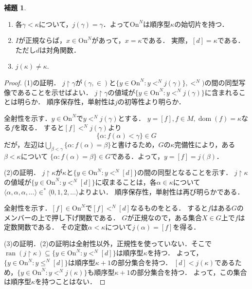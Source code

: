 \documentclass[uplatex]{jsarticle}
\newcommand{\range}{\operatorname{ran}}
\newcommand{\dom}{\operatorname{dom}}
\newcommand{\Ordinals}{\mathrm{On}}
\newcommand{\restrict}{\upharpoonright}
\newcommand{\seq}[1]{{\langle#1\rangle}}
\renewcommand\subset{\subseteq}
\theoremstyle{definition}
\newtheorem{lem}[thm]{補題}
\begin{document}
	\begin{lem}
		\begin{enumerate}
			\item 各$\gamma < \kappa$について，$j(\gamma) = \gamma$．よって$\Ordinals^N$は順序型$\kappa$の始切片を持つ．
			\item $I$が正規ならば，$x \in \Ordinals^N$があって，$x = \kappa$である．
			実際，$[d] = \kappa$である．ただし$d$は対角関数．
			\item $j(\kappa) \ne \kappa$.
		\end{enumerate}
	\end{lem}
	\begin{proof}
		(1)の証明．
		$j \upharpoonright \gamma$が$(\gamma, \in)$と$\{ y \in \Ordinals^N : y <^N j(\gamma)\}, <^N)$の間の同型写像であることを示せばよい．
		$j \upharpoonright \gamma$の値域が$\{ y \in \Ordinals^N : y <^N j(\gamma)\}$に含まれることは明らか．
		順序保存性，単射性は$j$の初等性より明らか．
		
		全射性を示す．$y \in \Ordinals^N$で$y <^N j(\gamma)$とする．
		$y = [f], f \in M, \dom(f) = \kappa$なる$f$を取る．
		すると$[f] <^N j(\gamma)$より
		\[
		\{ \alpha : f(\alpha) < \gamma \} \in G
		\]
		だが，左辺は$\bigcup_{\beta < \gamma} \{\alpha : f(\alpha) = \beta \}$と書けるため，$G$の$\kappa$完備性により，ある$\beta < \kappa$について $\{\alpha : f(\alpha) = \beta\} \in G$である．よって，$y = [f] = j(\beta)$．
		
		(2)の証明．
		$j \upharpoonright \kappa$が$\kappa$と$\{ y \in \Ordinals^N : y <^N [d] \}$の間の同型となることを示す．
		$j \upharpoonright \kappa$の値域が$\{ y \in \Ordinals^N : y <^N [d] \}$に収まることは，各$\alpha \in \kappa$について$\seq{\alpha, \alpha, \alpha, \dots} \in^* \seq{0, 1, 2, \dots}$よりよい．
		順序保存性，単射性は再び明らかである．
		
		全射性を示す．$[f] \in \Ordinals^N$で$[f] <^N [d]$なるものをとる．
		すると$f$はある$G$のメンバーの上で押し下げ関数である．
		$G$が正規なので，ある集合$X \in G$上で$f$は定数関数である．
		その定数$\alpha < \kappa$について$j(\alpha) = [f]$を得る．
		
		(3)の証明．(2)の証明は全射性以外，正規性を使っていない．そこで$\range(j \restrict \kappa) \subset \{ y \in \Ordinals^N : y <^N [d] \}$は順序型$\kappa$を持つ．
		よって，$\{ y \in \Ordinals^N : y \le^N [d] \}$は順序型$\kappa + 1$の部分集合を持つ．
		$[d] < j(\kappa)$であるため，$\{ y \in \Ordinals^N : y <^N j(\kappa) \}$も順序型$\kappa + 1$の部分集合を持つ．
		よって，この集合は順序型$\kappa$を持つことはない．
	\end{proof}
	
\end{document}
